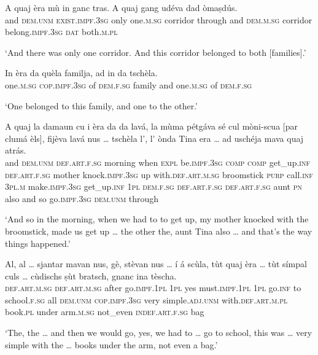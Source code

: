 \begin{linenumbers}
\gll    A quaj èra mù in ganc tras. A quaj gang udéva dad òmaṣdús.\\
and \textsc{dem.unm} \textsc{exist.impf.3sg} only one.\textsc{m.sg} corridor through and \textsc{dem.m.sg} corridor belong.\textsc{impf.3sg} \textsc{dat} both.\textsc{m.pl}\\
\end{linenumbers}
\medskip
\glt `And there was only one corridor. And this corridor belonged to both [families].'
\medskip

\begin{linenumbers}
\gll    In èra da quèla familja, ad in da tschèla.\\
one.\textsc{m.sg} \textsc{cop.impf.3sg} of \textsc{dem.f.sg} family and one.\textsc{m.sg} of \textsc{dem.f.sg}\\
\end{linenumbers}
\medskip
\glt `One belonged to this family, and one to the other.'
\medskip

\begin{linenumbers}
\gll    A quaj la damaun cu i èra da da lavá, la mùma pétgáva sé cul mòni-scua [par clumá èls], fijèva lavá nus … tschèla l’, l’ ònda Tina era … ad uschéja mava quaj atrás.\\
and \textsc{dem.unm} \textsc{def.art.f.sg} morning when \textsc{expl} be.\textsc{impf.3sg} \textsc{comp} \textsc{comp} get\_up.\textsc{inf} \textsc{def.art.f.sg} mother knock.\textsc{impf.3sg} up with.\textsc{def.art.m.sg} broomstick \textsc{purp} call.\textsc{inf} \textsc{3pl.m} make.\textsc{impf.3sg} get\_up.\textsc{inf} \textsc{1pl} {} \textsc{dem.f.sg} \textsc{def.art.f.sg} \textsc{def.art.f.sg} aunt \textsc{pn} also {} and so go.\textsc{impf.3sg} \textsc{dem.unm} through    \\
\end{linenumbers}
\medskip
\glt `And so in the morning, when we had to to get up, my mother knocked with the broomstick, made us get up … the other the, aunt Tina also … and that’s the way things happened.'
\medskip

\begin{linenumbers}
\gll    Al, al … sjantar mavan nus, gè, stèvan nus … í á scùla, tùt quaj èra … tùt símpal culs … cùdischs ṣùt bratsch, gnanc ina tèscha.\\
\textsc{def.art.m.sg} \textsc{def.art.m.sg} {} after go.\textsc{impf.1pl} \textsc{1pl} yes  must.\textsc{impf.1pl} \textsc{1pl} {}  go.\textsc{inf} to school.\textsc{f.sg} all \textsc{dem.unm} \textsc{cop.impf.3sg} {} very simple.\textsc{adj.unm} with.\textsc{def.art.m.pl} {} book.\textsc{pl} under arm.\textsc{m.sg} not\_even \textsc{indef.art.f.sg} bag\\
\end{linenumbers}
\medskip
\glt `The, the … and then we would go, yes, we had to … go to school, this was … very simple with the … books under the arm, not even a bag.'
\medskip

